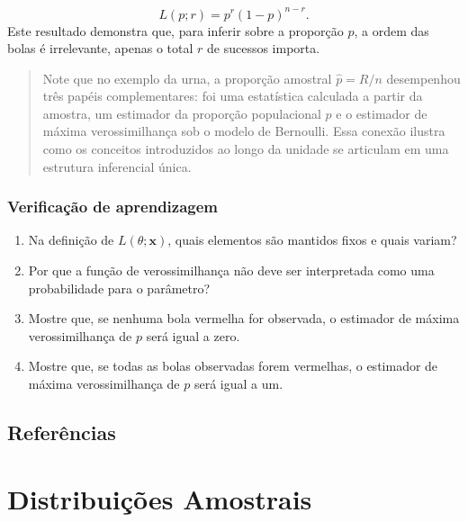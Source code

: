 \documentclass[
  letterpaper,
  DIV=11,
  numbers=noendperiod]{scrreprt}
\begin{document}
\[L(p; r) = p^{r}(1-p)^{n-r}.\] Este resultado demonstra que, para
inferir sobre a proporção \(p\), a ordem das bolas é irrelevante, apenas
o total \(r\) de sucessos importa.

\begin{quote}
Note que no exemplo da urna, a proporção amostral \(\hat{p}=R/n\)
desempenhou três papéis complementares: foi uma estatística calculada a
partir da amostra, um estimador da proporção populacional \(p\) e o
estimador de máxima verossimilhança sob o modelo de Bernoulli. Essa
conexão ilustra como os conceitos introduzidos ao longo da unidade se
articulam em uma estrutura inferencial única.
\end{quote}

\subsection*{Verificação de
aprendizagem}\label{verificauxe7uxe3o-de-aprendizagem-3}

\begin{enumerate}
\def\labelenumi{\arabic{enumi}.}
\item
  Na definição de \(L(\theta;\mathbf{x})\), quais elementos são mantidos
  fixos e quais variam?
\item
  Por que a função de verossimilhança não deve ser interpretada como uma
  probabilidade para o parâmetro?
\item
  Mostre que, se nenhuma bola vermelha for observada, o estimador de
  máxima verossimilhança de \(p\) será igual a zero.
\item
  Mostre que, se todas as bolas observadas forem vermelhas, o estimador
  de máxima verossimilhança de \(p\) será igual a um.
\end{enumerate}

\section*{Referências}\label{referuxeancias}



\chapter{Distribuições Amostrais}\label{distribuiuxe7uxf5es-amostrais}
\end{document}
